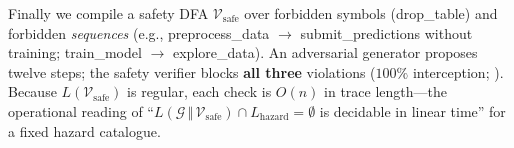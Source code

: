 Finally we compile a safety DFA $\mathcal{V}_{\mathrm{safe}}$ over
forbidden symbols (\textsf{drop\_table}) and forbidden \emph{sequences}
(e.g., \textsf{preprocess\_data} $\rightarrow$
\textsf{submit\_predictions} without training;
\textsf{train\_model} $\rightarrow$ \textsf{explore\_data}).  An
adversarial generator proposes twelve steps; the safety verifier blocks
\textbf{all three} violations ($100\%$ interception;
).  Because $L(\mathcal{V}_{\mathrm{safe}})$
is regular, each check is $O(n)$ in trace length---the operational
reading of ``$L(\mathcal{G}\,\Vert\,\mathcal{V}_{\mathrm{safe}})\cap
L_{\mathrm{hazard}}=\emptyset$ is decidable in linear time'' for a
fixed hazard catalogue.
